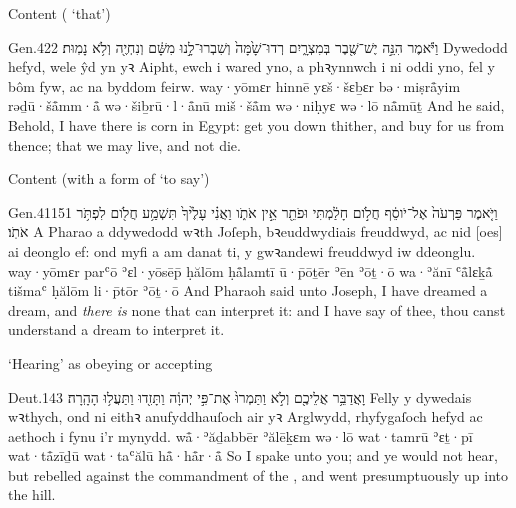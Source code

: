 \begin{frame}{\ex Content ( ‘that’)}
	\begin{example}{Gen.}{42}{2}{}{}
		\quoling
		{וַיֹּ֕אמֶר הִנֵּ֣ה   יֶשׁ־שֶׁ֖בֶר בְּמִצְרָ֑יִם רְדוּ־שָׁ֙מָּה֙ וְשִׁבְרוּ־לָ֣נוּ מִשָּׁ֔ם וְנִחְיֶ֖ה וְלֹ֥א נָמֽוּת׃}
		{Dywedodd hefyd, wele   ŷd yn yꝛ Aipht, ewch i wared yno, a phꝛynnwch i ni oddi yno, fel y bôm fyw, ac na byddom feirw.}
		{way·yōmɛr hinnē   yɛš·šɛḇɛr bə·miṣrå̄yim rəḏū·šå̄mm·å̄ wə·šiḇrū·l·å̄nū miš·šå̄m wə·niḥyɛ wə·lō nå̄mūṯ}
		{And he said, Behold, I have   there is corn in Egypt: get you down thither, and buy for us from thence; that we may live, and not die.}
	\end{example}
\end{frame}


\begin{frame}{\ex Content (with a form of  ‘to say’)}
	\begin{example}{Gen.}{41}{15}{1}{}
		\quoling
		{וַיֹּ֤אמֶר פַּרְעֹה֙ אֶל־יֹוסֵ֔ף חֲלֹ֣ום חָלַ֔מְתִּי וּפֹתֵ֖ר אֵ֣ין אֹתֹ֑ו וַאֲנִ֗י  עָלֶ֙יךָ֙  תִּשְׁמַ֥ע חֲלֹ֖ום לִפְתֹּ֥ר אֹתֹֽו׃}
		{A Pharao a ddywedodd wꝛth Joſeph, bꝛeuddwydiais freuddwyd, ac nid [oes] ai deonglo ef: ond myfi a   am danat ti, y gwꝛandewi freuddwyd iw ddeonglu.}
		{way·yōmɛr parʿō ʾɛl·yōsēp̄ ḥălōm ḥå̄lamtī ū·p̄ōṯēr ʾēn ʾōṯ·ō wa·ʾănī  ʿå̄lɛḵå̄  tišmaʿ ḥălōm li·p̄tōr ʾōṯ·ō}
		{And Pharaoh said unto Joseph, I have dreamed a dream, and \emph{there is} none that can interpret it: and I have  say of thee,  thou canst understand a dream to interpret it.}
	\end{example}
\end{frame}


\begin{frame}{\ex ‘Hearing’ as obeying or accepting}
	\begin{example}{Deut.}{1}{43}{}{}
		\quoling
		{וָאֲדַבֵּ֥ר אֲלֵיכֶ֖ם וְלֹ֣א  וַתַּמְרוּ֙ אֶת־פִּ֣י יְהוָ֔ה וַתָּזִ֖דוּ וַתַּעֲל֥וּ הָהָֽרָה׃}
		{Felly y dywedais wꝛthych, ond ni  eithꝛ anufyddhauſoch air yꝛ Arglwydd, rhyfygaſoch hefyd ac aethoch i fynu i'r mynydd.}
		{wå̄·ʾăḏabbēr ʾălēḵɛm wə·lō  wat·tamrū ʾɛṯ·pī {\YHWH} wat·tå̄zīḏū wat·taʿălū hå̄·hå̄r·å̄}
		{So I spake unto you; and ye would not hear, but rebelled against the commandment of the {\LORD}, and went presumptuously up into the hill.}
	\end{example}
\end{frame}


